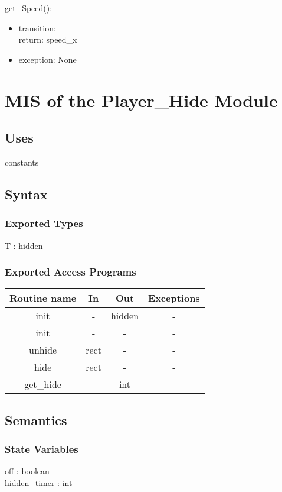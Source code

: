 \documentclass[12pt, titlepage]{article}
\begin{document}
\noindent get\_Speed():
\begin{itemize}
\item transition:\\
return: speed\_x\\
\item exception: None
\end{itemize}


\section {MIS of the Player\_Hide Module}

\subsection {Uses}

constants

\subsection {Syntax}

\subsubsection {Exported Types}
T : hidden

\subsubsection {Exported Access Programs}

\begin{tabular}{| c | c | c | c |}
\hline
\textbf{Routine name} & \textbf{In} & \textbf{Out} & \textbf{Exceptions}\\
\hline
init & - & hidden & -  \\
\hline
init & - & - & -\\
\hline
unhide & rect & - & -\\
\hline
hide & rect & - & -\\
\hline
get\_hide & - & int & -\\
\hline
\end{tabular}

\subsection {Semantics}

\subsubsection {State Variables}
off : boolean\\
hidden\_timer : int\\
\end{document}
